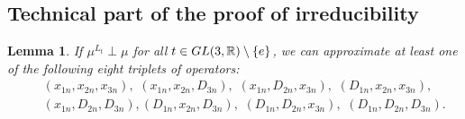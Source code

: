 \documentclass[preprint,12pt]{elsarticle}
\newtheorem{lem}[thm]{Lemma}
\numberwithin{equation}{section}
\begin{document}
\subsection{Technical part of the proof of irreducibility}
%
\label{sec.4.1}
%
\begin{lem}
\label{l.approx-(x,D).m=3}
If $\mu^{L_t}\perp\mu$ for all $t\in {\rm GL}(3,{\mathbb R})\setminus \{e\}
$, we can approximate at least  one of  the following  eight triplets of operators:
%
\begin{eqnarray*}
 &&(x_{1n},x_{2n},x_{3n}),\,\,(x_{1n},x_{2n},D_{3n}),\,\,(x_{1n},D_{2n},x_{3n}),\,\,(D_{1n},x_{2n},x_{3n}),\\
 &&(x_{1n},D_{2n},D_{3n}), (D_{1n},x_{2n},D_{3n}),\,\,(D_{1n},D_{2n},x_{3n}),\,\, (D_{1n},D_{2n},D_{3n}).
\end{eqnarray*}
\end{lem}
%
\end{document}
